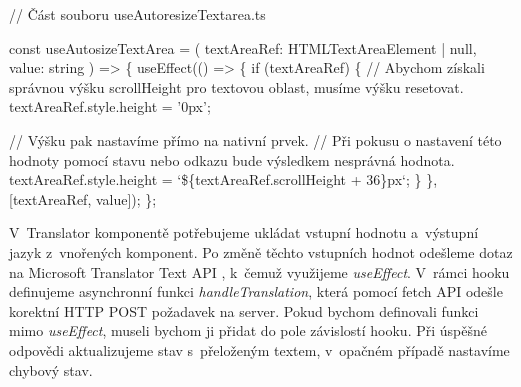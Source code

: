 \begin{prog}
// Část souboru useAutoresizeTextarea.ts

const useAutosizeTextArea = (
  textAreaRef: HTMLTextAreaElement | null, value: string
) => \{
  useEffect(() => \{
    if (textAreaRef) \{
      // Abychom získali správnou výšku scrollHeight 
        pro textovou oblast, musíme výšku resetovat.
      textAreaRef.style.height = '0px';

      // Výšku pak nastavíme přímo na nativní prvek.
      // Při pokusu o nastavení této hodnoty pomocí stavu 
        nebo odkazu bude výsledkem nesprávná hodnota.
      textAreaRef.style.height = `\$\{textAreaRef.scrollHeight + 36\}px`;
    \}
  \}, [textAreaRef, value]);
\};
\end{prog}

V~Translator komponentě potřebujeme ukládat vstupní hodnotu a~výstupní jazyk z~vnořených komponent. 
Po změně těchto vstupních hodnot odešleme dotaz na Microsoft Translator Text API \cite{translatortextapi}, k~čemuž využijeme \emph{useEffect}.
V~rámci hooku definujeme asynchronní funkci \emph{handleTranslation}, která pomocí fetch API odešle korektní HTTP POST požadavek na server. 
Pokud bychom definovali funkci mimo \emph{useEffect}, museli bychom ji přidat do pole závislostí hooku.
Při úspěšné odpovědi aktualizujeme stav s~přeloženým textem, v~opačném případě nastavíme chybový stav.

